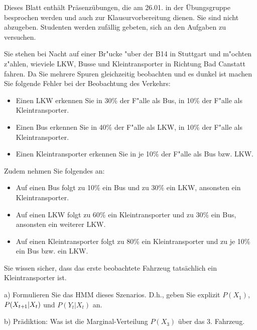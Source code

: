 

\renewcommand{\course}{Artificial Intelligence}
\renewcommand{\coursepicture}{course_ai}
\renewcommand{\coursedate}{Winter 2019}
\renewcommand{\exnum}{9}

\exercises

Dieses Blatt enthält Präsenzübungen, die am 26.01. in der
Übungsgruppe besprochen werden und auch zur Klausurvorbereitung
dienen. Sie sind nicht abzugeben. Studenten werden zufällig gebeten,
sich an den Aufgaben zu versuchen.


Sie stehen bei Nacht auf einer Br"ucke "uber der B14 in Stuttgart und
m"ochten z"ahlen, wieviele LKW, Busse und Kleintransporter in Richtung
Bad Canstatt fahren. Da Sie mehrere Spuren gleichzeitig beobachten und
es dunkel ist machen Sie folgende Fehler bei der Beobachtung des Verkehrs:
\begin{itemize}
\item Einen LKW erkennen Sie in 30\% der F"alle als Bus, in 10\% der
  F"alle als Kleintransporter.
\item Einen Bus erkennen Sie in 40\% der F"alle als LKW, in 10\% der
  F"alle als Kleintransporter.
\item Einen Kleintransporter erkennen Sie in je 10\% der F"alle als
 Bus bzw. LKW.
\end{itemize}
Zudem nehmen Sie folgendes an:
\begin{itemize}
\item Auf einen Bus folgt zu 10\% ein Bus und zu 30\% ein LKW,
  ansonsten ein Kleintransporter.
\item Auf einen LKW folgt zu 60\% ein Kleintransporter und zu 30\% ein
  Bus, ansonsten ein weiterer LKW.
\item Auf einen Kleintransporter folgt zu 80\% ein Kleintransporter
  und zu je 10\% ein Bus bzw. ein LKW.
\end{itemize}
Sie wissen sicher, dass das erste beobachtete Fahrzeug tatsächlich ein
Kleintransporter ist.

a) Formulieren Sie das HMM dieses Szenarios. D.h., geben Sie explizit
$P(X_1)$, $P(X_{t{{\hspace*{-.0pt}\text{\rm +}\hspace*{-.5pt}}1}}|X_t)$ und $P(Y_t|X_t)$ an.

b) Prädiktion: Was ist die Marginal-Verteilung $P(X_3)$ über das
3. Fahrzeug.

